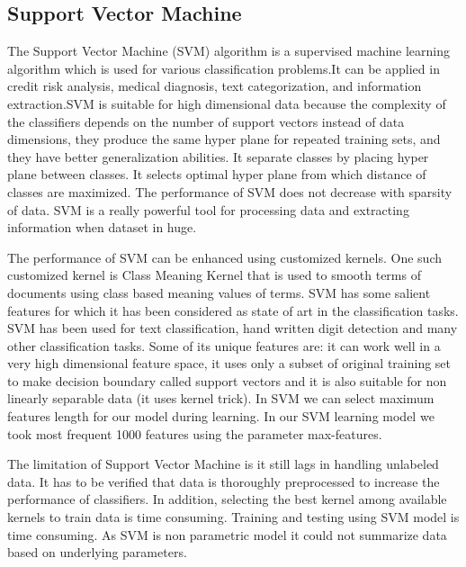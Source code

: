 \subsection{Support Vector Machine}
The Support Vector Machine (SVM) algorithm is a supervised machine learning algorithm which is used for various classification problems.It can be applied in credit risk analysis, medical diagnosis, text categorization, and information extraction.SVM is suitable for high dimensional data because the complexity of the classifiers depends on the number
of support vectors instead of data dimensions, they produce the same hyper plane for repeated training sets, and they have better generalization abilities. It separate classes by placing hyper plane between classes. It selects optimal hyper plane from which distance of classes are maximized. The performance of SVM does not decrease with sparsity of data. SVM is a really powerful tool for processing data and extracting information when dataset in huge.
\par 
\vspace{0.5cm}
The performance of SVM can be enhanced using customized kernels. One such customized kernel is Class Meaning Kernel that is used to smooth terms of documents using class based meaning values of terms. SVM has some salient features for which it has been considered as state of art in the classification tasks. SVM has been used for text classification, hand written digit detection and many other classification tasks. Some of its unique features are: it can work well in a very high dimensional feature space, it uses only a subset of original training set to make decision boundary called support vectors and it is also suitable for non linearly separable data (it uses kernel trick). In SVM we can select maximum features length for our model during learning. In our SVM learning model we took most frequent 1000 features using the parameter max-features.  
\par 
\vspace{0.5cm}
The limitation of Support Vector Machine is it still lags in handling unlabeled data. It has to be verified that data is thoroughly preprocessed to increase the performance of classifiers. In addition, selecting the best kernel among available kernels to train data is time consuming. Training and testing using SVM model is time consuming. As SVM is non parametric model it could not summarize data based on underlying parameters. 
\clearpage

